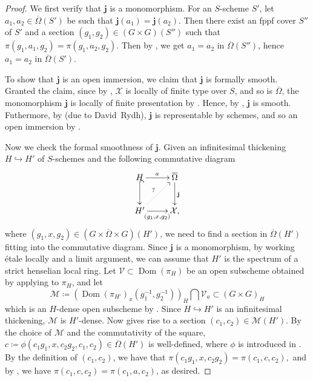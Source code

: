 \documentclass[11pt, reqno]{amsart}
\theoremstyle{plain}
\theoremstyle{definition}
\DeclareMathOperator{\Dom}{Dom} %
\begin{document}
\begin{proof}
    We first verify that $\mathbf{j}$ is a monomorphism.
    For an $S$-scheme $S'$, let $a_1,a_2\in\overline{\Omega}(S')$ be such that $\mathbf{j}(a_1)=\mathbf{j}(a_2)$. Then there exist an fppf cover $S''$ of $S'$ and a section $(g_1,g_2)\in( G\times G)(S'')$ such that $\pi(g_1,a_1,g_2)=\pi(g_1,a_2,g_2)$. Then by , we get $a_1=a_2$ in $\overline{\Omega}(S'')$, hence $a_1=a_2$ in $\overline{\Omega}(S')$.

    To show that $\mathbf{j}$ is an open immersion, we claim that $\mathbf{j}$ is formally smooth. Granted the claim, since by , $\mathcal{X}$ is locally of finite type over $S$, and so is $\overline{\Omega}$, the monomorphism $\mathbf{j}$ is locally of finite presentation by \cite[06Q6]{stacks-project}. Hence, by \cite[0DP0]{stacks-project}, $\mathbf{j}$ is smooth. Futhermore, by \cite[0B8A]{stacks-project} (due to David~Rydh), $\mathbf{j}$ is representable by schemes, and so an open immersion by \cite[025G]{stacks-project}.

    Now we check the formal smoothness of $\mathbf{j}$. Given an infinitesimal thickening $H\hookrightarrow H'$ of $S$-schemes and the following commutative diagram 
    $$\xymatrix{
H \ar@{^{(}->}[d] \ar[r]^a &\overline{\Omega}\ar[d]^{\mathbf{j}}\\
H' \ar[r]_{(g_1,x,g_2)}   \ar@{.>}[ur]^{?}       &\mathcal{X},}$$
where $(g_1,x,g_2)\in(G\times \overline{\Omega}\times G)(H')$,
we need to find a section in $\overline{\Omega}(H')$ fitting into the commutative diagram. Since $\mathbf{j}$ is a monomorphism, by working étale locally and a limit argument, we can assume that $H'$ is the spectrum of a strict henselian local ring. Let $\mathcal{V}\subset \Dom(\pi_{H})$ be an open subscheme obtained by applying  to $\pi_{H}$, and let 
$$\mathcal{M}\coloneq (\Dom(\pi_{H'})_x(g_1^{-1},g_2^{-1} ))_H\bigcap \mathcal{V}_a\subset (G\times G)_{H}$$
which is an $H$-dense open subscheme by . Since $H\hookrightarrow H'$ is an infinitesimal thickening, $\mathcal{M}$ is $H'$-dense. Now \cite[\S~2.3, Proposition~5]{BLR} gives rise to a section $(c_1,c_2)\in\mathcal{M}(H')$. By the choice of $\mathcal{M}$ and the commutativity of the square, $c\coloneq \phi(c_1g_1,x,c_2g_2, c_1,c_2)\in \overline{\Omega}(H')$ is well-defined, where $\phi$ is introduced in . By the definition of $(c_1,c_2)$, we have that
$\pi(c_1g_1,x,c_2g_2)=\pi(c_1,c,c_2),$
and by , we have $\pi(c_1,c,c_2)=\pi(c_1,a,c_2)$, as desired.
\end{proof}
\end{document}
